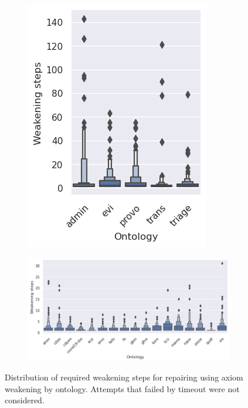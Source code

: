 \begin{figure}[ht]
  \centering
  \begin{subfigure}[T]{0.25\textwidth}
    \includegraphics[width=\textwidth]{resources/steps-ontology-violin-1.png}
  \end{subfigure}
  \begin{subfigure}[T]{0.715\textwidth}
    \includegraphics[width=\textwidth]{resources/steps-ontology-violin-2.png}
  \end{subfigure}
  \caption{Distribution of required weakening steps for repairing using axiom weakening by ontology. Attempts that failed by timeout were not considered.}
\end{figure}

